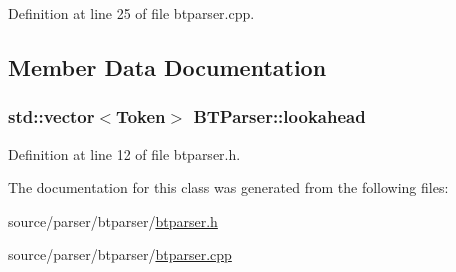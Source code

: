 Definition at line 25 of file btparser.cpp.



\subsection{Member Data Documentation}
\hypertarget{class_b_t_parser_a796693745ebe354914eeacddba20f109}{
\subsubsection[{lookahead}]{\setlength{\rightskip}{0pt plus 5cm}std::vector$<${\bf Token}$>$ {\bf BTParser::lookahead}}}
\label{class_b_t_parser_a796693745ebe354914eeacddba20f109}


Definition at line 12 of file btparser.h.



The documentation for this class was generated from the following files:\begin{DoxyCompactItemize}
\item 
source/parser/btparser/\hyperlink{btparser_8h}{btparser.h}\item 
source/parser/btparser/\hyperlink{btparser_8cpp}{btparser.cpp}\end{DoxyCompactItemize}
